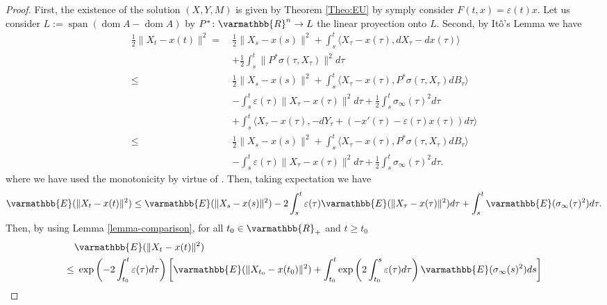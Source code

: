 \documentclass[11pt,reqno]{article}
\let\mathbb=\varmathbb
\newcommand{\R}{\mathbb{R}}
\newcommand{\dom}{\operatorname{dom}}
\renewcommand{\epsilon}{\varepsilon}
\newcommand{\1}{\mathds{1}}
\numberwithin{equation}{section}  %
\theoremstyle{plain}
\theoremstyle{definition}
\theoremstyle{remark}
\numberwithin{theorem}{section}
\numberwithin{remark}{section}
\numberwithin{example}{section}
\begin{document}
\begin{proof}
  First, the existence of the solution $(X,Y,M)$ is given by Theorem \ref{Theo:EU} by symply consider $F(t,x)=\epsilon(t) x$. Let us consider  $L:=\operatorname{span}(\dom A  - \dom A)$  by $P^\ast \colon \R^n \to L$ the linear proyection onto $L$. Second, by Itô's Lemma we have
    \begin{equation}\label{eqn-tikhonv2222-}
        \begin{aligned}
            \frac{1}{2}\|X_t-x(t)\|^2 = \ & \frac{1}{2}\|X_s-x(s)\|^2 + \int_s^t\langle X_\tau-x(\tau),dX_\tau-dx(\tau)\rangle\\
            &+\frac{1}{2}\int_s^t\|P^\ast\sigma(\tau,X_\tau)\|^2d\tau\\
            \leq \ & \frac{1}{2}\|X_s-x(s)\|^2 + \int_s^t\langle X_\tau-x(\tau), P^\ast\sigma(\tau,X_\tau)dB_\tau\rangle\\
            &-\int_s^t\epsilon(\tau)\|X_\tau-x(\tau)\|^2d\tau + \frac{1}{2}\int_s^t\sigma_\infty(\tau)^2d\tau\\
            &+\int_s^t\langle X_\tau-x(\tau),-dY_\tau+(-x'(\tau)-\epsilon(\tau)x(\tau))d\tau\rangle\\
            \leq \ & \frac{1}{2}\|X_s-x(s)\|^2 + \int_s^t\langle X_\tau-x(\tau), P^\ast\sigma(\tau,X_\tau)dB_\tau\rangle\\
            &-\int_s^t\epsilon(\tau)\|X_\tau-x(\tau)\|^2d\tau + \frac{1}{2}\int_s^t\sigma_\infty(\tau)^2d\tau.
        \end{aligned}
    \end{equation}
    where we have used the monotonicity by virtue of \cite[Proposition 6.17]{MR3308895}. Then, taking expectation we have 
    \begin{equation*}
        \begin{aligned}
            \mathbb{E}(\|X_t-x(t)\|^2)\leq \mathbb{E}(\|X_s-x(s)\|^2)-2\int_s^t\epsilon(\tau)\mathbb{E}(\|X_\tau-x(\tau)\|^2)d\tau+\int_s^t\mathbb{E}(\sigma_\infty(\tau)^2)d\tau.
        \end{aligned}
    \end{equation*}
    Then, by using Lemma \ref{lemma-comparison}, for all $t_0\in \R_+$ and $t\geq t_0$
    \begin{equation*}
        \begin{aligned}
        &\mathbb{E}(\|X_t-x(t)\|^2)\\
        \leq & \ \exp\left(-2\int_{t_0}^t\epsilon(\tau)d\tau\right)\left[\mathbb{E}(\|X_{t_0}-x(t_0)\|^2)+\int_{t_0}^t\exp\left(2\int_{t_0}^s\epsilon(\tau)d\tau\right)\mathbb{E}(\sigma_\infty(s)^2)ds\right]

\end{aligned}
\end{equation*}
\end{proof}
\end{document}
